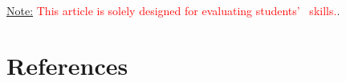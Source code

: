 \documentclass{article}
\begin{document}
\vspace{2em}
\underline{Note:} \textcolor{red}{ This article is solely designed for evaluating students’ \LATEX\ skills.}.

\section{References}



\end{document}
